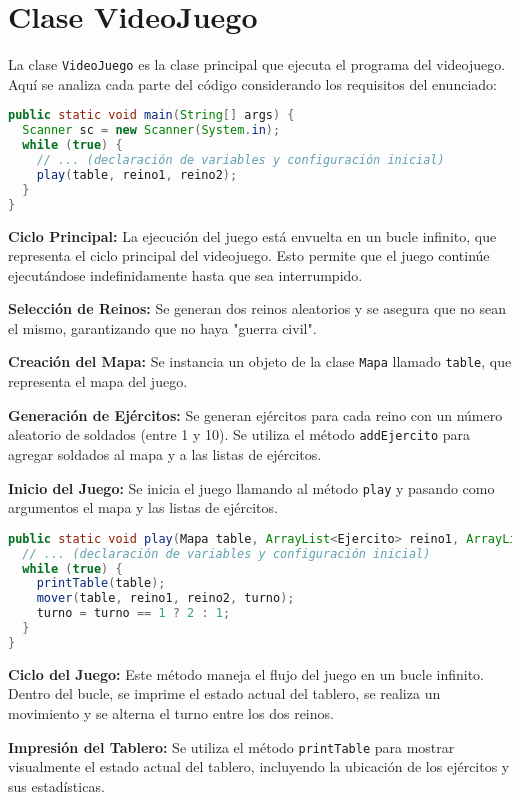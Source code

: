 \section{Clase VideoJuego}
La clase \texttt{VideoJuego} es la clase principal que ejecuta el programa del videojuego. Aquí se analiza cada parte del código considerando los requisitos del enunciado:

\begin{lstlisting}[language=Java]
public static void main(String[] args) {
  Scanner sc = new Scanner(System.in);
  while (true) {
    // ... (declaración de variables y configuración inicial)
    play(table, reino1, reino2);
  }
}
\end{lstlisting}

\textbf{Ciclo Principal:} La ejecución del juego está envuelta en un bucle infinito, que representa el ciclo principal del videojuego. Esto permite que el juego continúe ejecutándose indefinidamente hasta que sea interrumpido.

\textbf{Selección de Reinos:} Se generan dos reinos aleatorios y se asegura que no sean el mismo, garantizando que no haya "guerra civil".

\textbf{Creación del Mapa:} Se instancia un objeto de la clase \texttt{Mapa} llamado \texttt{table}, que representa el mapa del juego.

\textbf{Generación de Ejércitos:} Se generan ejércitos para cada reino con un número aleatorio de soldados (entre 1 y 10). Se utiliza el método \texttt{addEjercito} para agregar soldados al mapa y a las listas de ejércitos.

\textbf{Inicio del Juego:} Se inicia el juego llamando al método \texttt{play} y pasando como argumentos el mapa y las listas de ejércitos.

\begin{lstlisting}[language=Java]
public static void play(Mapa table, ArrayList<Ejercito> reino1, ArrayList<Ejercito> reino2) {
  // ... (declaración de variables y configuración inicial)
  while (true) {
    printTable(table);
    mover(table, reino1, reino2, turno);
    turno = turno == 1 ? 2 : 1;
  } 
}
\end{lstlisting}

\textbf{Ciclo del Juego:} Este método maneja el flujo del juego en un bucle infinito. Dentro del bucle, se imprime el estado actual del tablero, se realiza un movimiento y se alterna el turno entre los dos reinos.

\textbf{Impresión del Tablero:} Se utiliza el método \texttt{printTable} para mostrar visualmente el estado actual del tablero, incluyendo la ubicación de los ejércitos y sus estadísticas.

